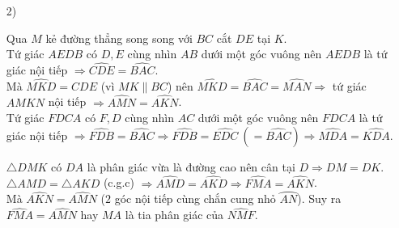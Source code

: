 \begin{ex}
{\begin{enumerate}
			\item[2)]
			\immini
				{
					Qua $M$ kẻ đường thẳng song song với $BC$ cắt $DE$ tại $K$. \\
					Tứ giác $AEDB$ có $D,E$ cùng nhìn $AB$ dưới một góc vuông nên $AEDB$ là tứ giác nội tiếp $\Rightarrow \widehat{CDE} = \widehat{BAC}$. \\
					Mà $\widehat{MKD} = \widehat{CDE}$ (vì $MK \parallel BC$) nên $\widehat{MKD} = \widehat{BAC} = \widehat{MAN} \Rightarrow$ tứ giác $AMKN$ nội tiếp $\Rightarrow \widehat{AMN} = \widehat{AKN}$. \\
					Tứ giác $FDCA$ có $F,D$ cùng nhìn $AC$ dưới một góc vuông nên $FDCA$ là tứ giác nội tiếp $\Rightarrow \widehat{FDB} = \widehat{BAC} \Rightarrow \widehat{FDB} = \widehat{EDC}~(=\widehat{BAC}) \Rightarrow \widehat{MDA} = \widehat{KDA}$. 
					
				}
				{
				}
			$\triangle DMK$ có $DA$ là phân giác vừa là đường cao nên cân tại $D \Rightarrow DM = DK$. \\
			$\triangle AMD = \triangle AKD$ (c.g.c) $\Rightarrow \widehat{AMD} = \widehat{AKD} \Rightarrow \widehat{FMA} = \widehat{AKN}$.\\
			Mà $\widehat{AKN} = \widehat{AMN}$ ($2$ góc nội tiếp cùng chắn cung nhỏ $\wideparen{AN}$). Suy ra $\widehat{FMA} = \widehat{AMN}$ hay $MA$ là tia phân giác của $\widehat{NMF}$.
		\end{enumerate}
	}
\end{ex}
